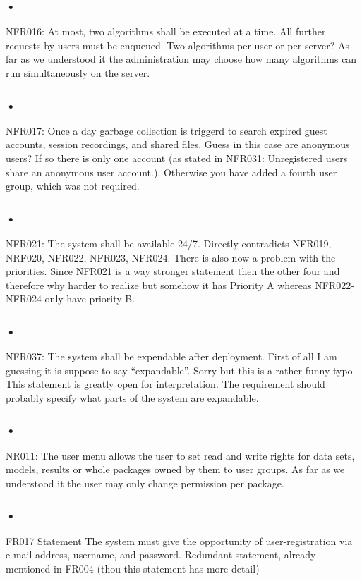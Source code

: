 \documentclass{article}
\begin{document}
\subsubsection{•}
NFR016: At most, two algorithms shall be executed at a time. All further requests by users must be enqueued.
Two algorithms per user or per server? As far as we understood it the administration may choose how many algorithms can run simultaneously on the server.

\subsubsection{•}
NFR017: Once a day garbage collection is triggerd to search expired guest accounts, session recordings, and shared files.
Guess in this case are anonymous users? If so there is only one account (as stated in NFR031: Unregistered users share an anonymous user account.). Otherwise you have added a fourth user group, which was not required.

\subsubsection{•}
NFR021: The system shall be available 24/7.
Directly contradicts NFR019, NRF020, NFR022, NFR023, NFR024. There is also now a problem with the priorities. Since NFR021 is a way stronger statement then the other four and therefore why harder to realize but somehow it has Priority A whereas NFR022-NFR024 only have priority B.

\subsubsection{•}
NFR037: The system shall be expendable after deployment.
First of all I am guessing it is suppose to say “expandable”. Sorry but this is a rather funny typo. This statement is greatly open for interpretation. The requirement should probably specify what parts of the system are expandable.

\subsubsection{•}
NR011: The user menu allows the user to set read and write rights for data sets, models, results or whole packages owned by them to user groups.
As far as we understood it the user may only change permission per package.

\subsubsection{•}
FR017 Statement The system must give the opportunity of user-registration via e-mail-address, username, and password. 
Redundant statement, already mentioned in FR004 (thou this statement has more detail)
\end{document}
